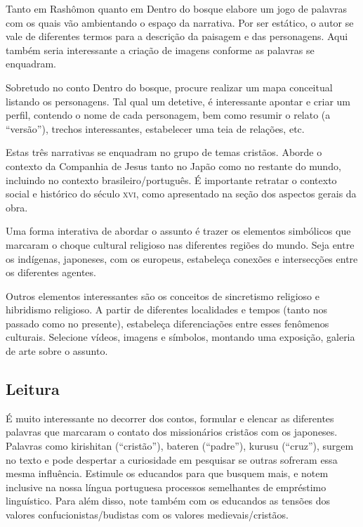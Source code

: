 \documentclass[12pt]{extarticle}
\begin{document}
Tanto em Rashômon quanto em Dentro do bosque elabore um jogo
de palavras com os quais vão ambientando o espaço da narrativa. Por ser
estático, o autor se vale de diferentes termos para a descrição da
paisagem e das personagens. Aqui também seria interessante a criação de
imagens conforme as palavras se enquadram.

Sobretudo no conto Dentro do bosque, procure realizar um mapa conceitual
listando os personagens. Tal qual um detetive, é interessante apontar e
criar um perfil, contendo o nome de cada personagem, bem como resumir o
relato (a ``versão''), trechos interessantes, estabelecer uma teia de
relações, etc.

Estas três narrativas se enquadram no grupo de temas cristãos. Aborde o
contexto da Companhia de Jesus tanto no Japão como no restante do mundo,
incluindo no contexto brasileiro/português. É importante retratar o
contexto social e histórico do século \textsc{xvi}, como apresentado na seção dos
aspectos gerais da obra.

Uma forma interativa de abordar o assunto é trazer os elementos
simbólicos que marcaram o choque cultural religioso nas diferentes
regiões do mundo. Seja entre os indígenas, japoneses, com os europeus,
estabeleça conexões e intersecções entre os diferentes agentes.

Outros elementos interessantes são os conceitos de sincretismo religioso
e hibridismo religioso. A partir de diferentes localidades e tempos
(tanto nos passado como no presente), estabeleça diferenciações entre
esses fenômenos culturais. Selecione vídeos, imagens e símbolos,
montando uma exposição, galeria de arte sobre o assunto.

\subsection{Leitura}

É muito interessante no decorrer dos contos, formular e
elencar as diferentes palavras que marcaram o contato dos missionários
cristãos com os japoneses. Palavras como kirishitan (``cristão''),
bateren (``padre''), kurusu (``cruz''), surgem no texto e pode despertar
a curiosidade em pesquisar se outras sofreram essa mesma influência.
Estimule os educandos para que busquem mais, e notem inclusive na nossa
língua portuguesa processos semelhantes de empréstimo linguístico. Para
além disso, note também com os educandos as tensões dos valores
confucionistas/budistas com os valores medievais/cristãos.
\end{document}

